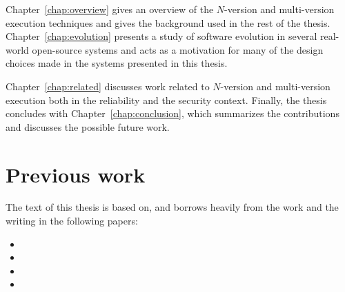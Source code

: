 Chapter~\ref{chap:overview} gives an overview of the $N$-version and
multi-version execution techniques and gives the background used in the rest of
the thesis. Chapter~\ref{chap:evolution} presents a study of software
evolution in several real-world open-source systems and acts as a motivation for many
of the design choices made in the systems presented in this thesis.

Chapter~\ref{chap:related} discusses work related to $N$-version and multi-version
execution both in the reliability and the security context. Finally, the thesis concludes
with Chapter~\ref{chap:conclusion}, which summarizes the contributions and
discusses the possible future work.


\section{Previous work}

The text of this thesis is based on, and borrows heavily from the work and the
writing in the following papers:

\begin{itemize}
\item {}
\item {}
\item {}
\item {}
\end{itemize}

